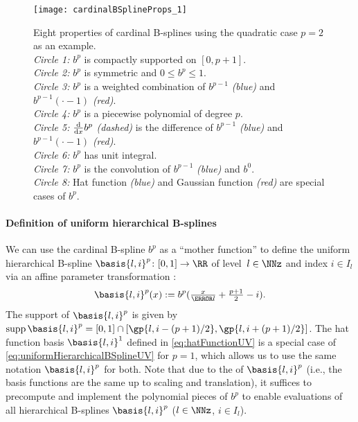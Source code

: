 \begin{figure}
  \texttt{[image: cardinalBSplineProps\_1]}%
  \caption{%
    Eight properties of cardinal B-splines using the quadratic case
    $p = 2$ as an example.\\
    \emph{Circle 1:} $b^p$ is compactly supported on $[0, p+1]$.\\
    \emph{Circle 2:} $b^p$ is symmetric and $0 \le b^p \le 1$.\\
    \emph{Circle 3:} $b^p$ is a weighted combination of
    $b^{p-1}$ \emph{\textcolor{C0}{(blue)}} and
    $b^{p-1}({\cdot} - 1)$ \emph{\textcolor{C1}{(red)}}.\\
    \emph{Circle 4:} $b^p$ is a piecewise polynomial of degree $p$.\\
    \emph{Circle 5:} $\frac{\mathop{}\!\mathrm{d}}{\mathop{}\!\mathrm{d}{}x} b^p$ \emph{(dashed)}
    is the difference of
    $b^{p-1}$ \emph{\textcolor{C0}{(blue)}} and
    $b^{p-1}({\cdot} - 1)$ \emph{\textcolor{C1}{(red)}}.\\
    \emph{Circle 6:} $b^p$ has unit integral.\\
    \emph{Circle 7:} $b^p$ is the convolution of
    $b^{p-1}$ \emph{\textcolor{C0}{(blue)}} and $b^0$.\\
    \emph{Circle 8:} Hat function \emph{\textcolor{C0}{(blue)}} and
    Gaussian function \emph{\textcolor{C1}{(red)}}
    are special cases of $b^p$.%
  }%
  \label{fig:cardinalBSplineProps}
\end{figure}

\paragraph{Definition of uniform hierarchical B-splines}

%
We can use the cardinal B-spline $b^p$ as a ``mother function'' to
define the uniform hierarchical B-spline
$\basis{l,i}^p\colon [0, 1] \to \RR$ of level~$l \in \NNz$ and index
$i \in I_l$ via an affine parameter transformation
\cite{Pflueger10Spatially}:
\begin{equation}
  \label{eq:uniformHierarchicalBSplineUV}
  \basis{l,i}^p(x)
  := b^p(\tfrac{x}{\ms{l}} + \tfrac{p+1}{2} - i).
\end{equation}
The support of $\basis{l,i}^p$ is given
by $\supp \basis{l,i}^p = [0, 1] \cap [\gp{l,i-(p+1)/2}, \gp{l,i+(p+1)/2}]$.
The hat function basis $\basis{l,i}^1$ defined in
\eqref{eq:hatFunctionUV} is a special case of
\eqref{eq:uniformHierarchicalBSplineUV} for $p = 1$,
which allows us to use the same notation $\basis{l,i}^p$ for both.
Note that due to the  of $\basis{l,i}^p$
(i.e., the basis functions are the same up to scaling and translation),
it suffices to precompute and implement the polynomial pieces of $b^p$
to enable evaluations of all hierarchical B-splines
$\basis{l,i}^p$ ($l \in \NNz$, $i \in I_l$).

